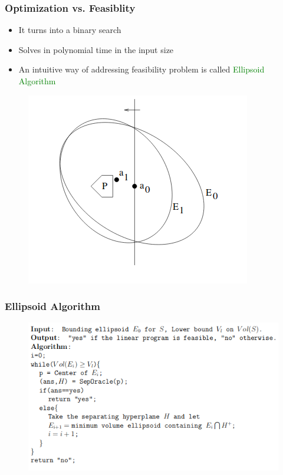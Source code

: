 \documentclass[aspectratio=169]{beamer}
\newcommand{\tc}[2]{\textcolor{#1}{#2}}
\newcommand{\tcg}[1]{\tc{green}{#1}}
\begin{document}
\begin{frame}
	\frametitle{Optimization vs. Feasiblity}
	\begin{itemize}
		\item It turns into a binary search
		\item Solves in polynomial time in the input size
		\item An intuitive way of addressing feasibility problem is called \tcg{Ellipsoid Algorithm}
	\end{itemize}

	\begin{figure}
		\centering
		\includegraphics[scale=.40]{ellips.png}
		\label{ellipsoid}
	\end{figure}

\end{frame}

\begin{frame}
	\frametitle{Ellipsoid Algorithm}
	\begin{figure}
		\centering
		\includegraphics[scale=.60]{alg.png}
	\end{figure}
\end{frame}
\end{document}
